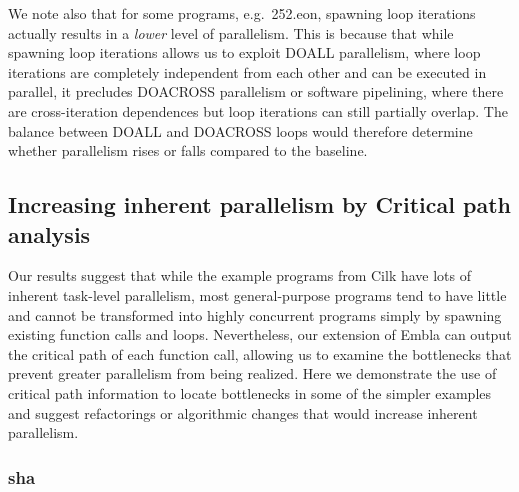 We note also that for some programs, e.g.\ \textsf{252.eon}, spawning loop iterations actually results in a \emph{lower} level of parallelism.
This is because that while spawning loop iterations allows us to exploit DOALL parallelism, where loop iterations are completely independent from each other and can be executed in parallel, it precludes DOACROSS parallelism or software pipelining, where there are cross-iteration dependences but loop iterations can still partially overlap.
The balance between DOALL and DOACROSS loops would therefore determine whether parallelism rises or falls compared to the baseline.

\subsection{Increasing inherent parallelism by Critical path analysis} \label{sresults:increasing}

Our results suggest that while the example programs from Cilk have lots of inherent task-level parallelism, most general-purpose programs tend to have little and cannot be transformed into highly concurrent programs simply by spawning existing function calls and loops.
Nevertheless, our extension of Embla can output the critical path of each function call, allowing us to examine the bottlenecks that prevent greater parallelism from being realized.
Here we demonstrate the use of critical path information to locate bottlenecks in some of the simpler examples and suggest refactorings or algorithmic changes that would increase inherent parallelism.

\subsubsection{\textsf{sha}}

